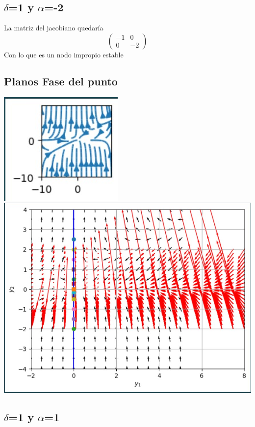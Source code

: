 \documentclass{article}
\begin{document}
      \subsection*{$\delta$=1 y $\alpha$=-2}
       
        La matriz del jacobiano quedaría
        \[
         \left(
         \begin{array}{lc}
           -1 & 0\\
           0 & -2
         \end{array}
         \right)
         \]         
         Con lo que es un nodo impropio estable
         \subsection*{Planos Fase del punto }
         \noindent
         \includegraphics{isoclinas d=1 a=-2.jpg}
          \includegraphics{Diagrama de fases para a-2 d1.jpg}


     \subsection*{$\delta$=1 y $\alpha$=1}
       
\end{document}
